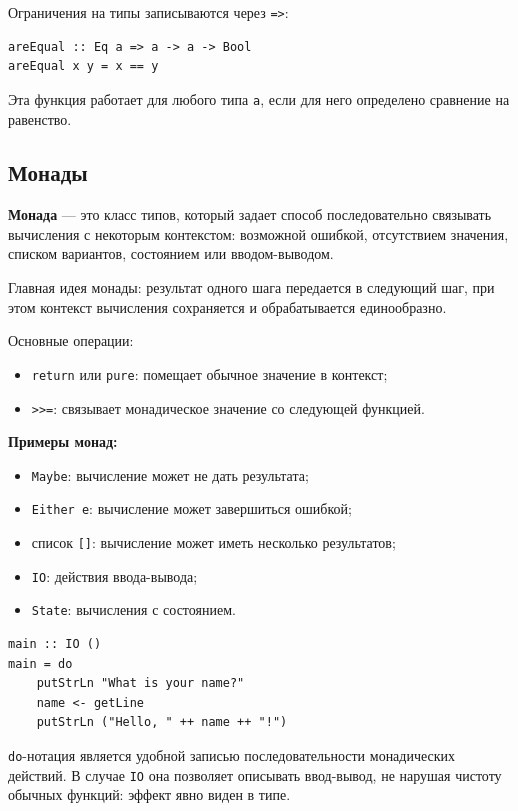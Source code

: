 Ограничения на типы записываются через \texttt{=>}:

\begin{verbatim}
areEqual :: Eq a => a -> a -> Bool
areEqual x y = x == y
\end{verbatim}

Эта функция работает для любого типа \texttt{a}, если для него определено сравнение на равенство.

\subsection*{Монады}

\textbf{Монада} --- это класс типов, который задает способ последовательно связывать вычисления с некоторым контекстом: возможной ошибкой, отсутствием значения, списком вариантов, состоянием или вводом-выводом.

Главная идея монады: результат одного шага передается в следующий шаг, при этом контекст вычисления сохраняется и обрабатывается единообразно.

Основные операции:
\begin{itemize}
    \item \texttt{return} или \texttt{pure}: помещает обычное значение в контекст;
    \item \texttt{>>=}: связывает монадическое значение со следующей функцией.
\end{itemize}

\textbf{Примеры монад:}
\begin{itemize}
    \item \texttt{Maybe}: вычисление может не дать результата;
    \item \texttt{Either e}: вычисление может завершиться ошибкой;
    \item список \texttt{[]}: вычисление может иметь несколько результатов;
    \item \texttt{IO}: действия ввода-вывода;
    \item \texttt{State}: вычисления с состоянием.
\end{itemize}

\begin{verbatim}
main :: IO ()
main = do
    putStrLn "What is your name?"
    name <- getLine
    putStrLn ("Hello, " ++ name ++ "!")
\end{verbatim}

\texttt{do}-нотация является удобной записью последовательности монадических действий. В случае \texttt{IO} она позволяет описывать ввод-вывод, не нарушая чистоту обычных функций: эффект явно виден в типе.

